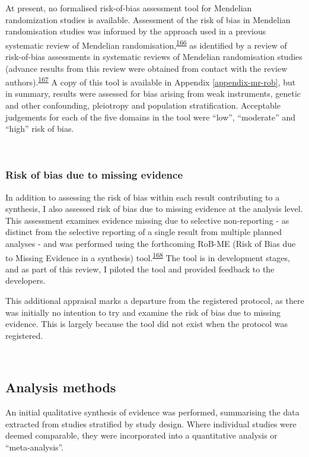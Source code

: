 \documentclass[a4paper, twoside]{templates/ociamthesis}
\begin{document}
At present, no formalised risk-of-bias assessment tool for Mendelian randomization studies is available. Assessment of the risk of bias in Mendelian randomisation studies was informed by the approach used in a previous systematic review of Mendelian randomisation,\textsuperscript{\protect\hyperlink{ref-mamluk2020}{166}} as identified by a review of risk-of-bias assessments in systematic reviews of Mendelian randomisation studies (advance results from this review were obtained from contact with the review authors).\textsuperscript{\protect\hyperlink{ref-spiga2021}{167}} A copy of this tool is available in Appendix \ref{appendix-mr-rob}, but in summary, results were assessed for bias arising from weak instruments, genetic and other confounding, pleiotropy and population stratification. Acceptable judgements for each of the five domains in the tool were ``low'', ``moderate'' and ``high'' risk of bias.

~

\hypertarget{methods-rob-me}{%
\subsubsection{Risk of bias due to missing evidence}\label{methods-rob-me}}

In addition to assessing the risk of bias within each result contributing to a synthesis, I also assessed risk of bias due to missing evidence at the analysis level. This assessment examines evidence missing due to selective non-reporting - as distinct from the selective reporting of a single result from multiple planned analyses - and was performed using the forthcoming RoB-ME (Risk of Bias due to Missing Evidence in a synthesis) tool.\textsuperscript{\protect\hyperlink{ref-zotero-15123}{168}} The tool is in development stages, and as part of this review, I piloted the tool and provided feedback to the developers.

This additional appraisal marks a departure from the registered protocol, as there was initially no intention to try and examine the risk of bias due to missing evidence. This is largely because the tool did not exist when the protocol was registered.

~

\hypertarget{analysis-methods}{%
\subsection{Analysis methods}\label{analysis-methods}}

An initial qualitative synthesis of evidence was performed, summarising the data extracted from studies stratified by study design. Where individual studies were deemed comparable, they were incorporated into a quantitative analysis or ``meta-analysis''.
\end{document}
